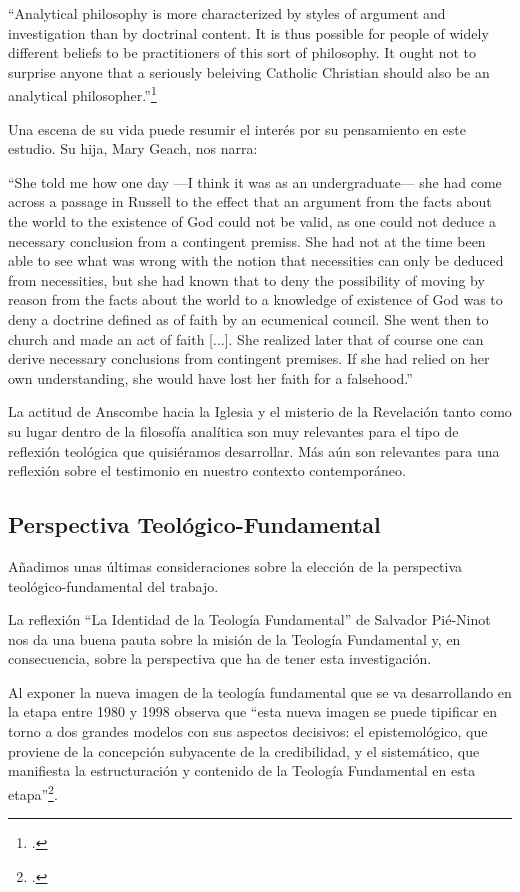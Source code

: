 \documentclass[12pt]{article}
\begin{document}
{``Analytical philosophy is more characterized by styles of argument and investigation than by doctrinal content. It is thus possible for people of widely different beliefs to be practitioners of this sort of philosophy. It ought not to surprise anyone that a seriously beleiving Catholic Christian should also be an analytical philosopher.''\footcite[66]{opinionsanscombe}

Una escena de su vida puede resumir el interés por su pensamiento en este estudio. Su hija, Mary Geach, nos narra:

``She told me how one day ---I think it was as an undergraduate--- she had come across a passage in Russell to the effect that an argument from the facts about the world to the existence of God could not be valid, as one could not deduce a necessary conclusion from a contingent premiss. She had not at the time been able to see what was wrong with the notion that necessities can only be deduced from necessities, but she had known that to deny the possibility of moving by reason from the facts about the world to a knowledge of existence of God was to deny a doctrine defined as of faith by an ecumenical council. She went then to church and made an act of faith [...]. She realized later that of course one can derive necessary conclusions from contingent premises. If she had relied on her own understanding, she would have lost her faith for a falsehood.''

La actitud de Anscombe hacia la Iglesia y el misterio de la Revelación tanto como su lugar dentro de la filosofía analítica son muy relevantes para el tipo de reflexión teológica que quisiéramos desarrollar. Más aún son relevantes para una reflexión sobre el testimonio en nuestro contexto contemporáneo.

\subsection{Perspectiva Teológico-Fundamental}

Añadimos unas últimas consideraciones sobre la elección de la perspectiva teológico-fundamental del trabajo. 

La reflexión ``La Identidad de la Teología Fundamental'' de Salvador Pié-Ninot nos da una buena pauta sobre la misión de la Teología Fundamental y, en consecuencia, sobre la perspectiva que ha de tener esta investigación. 

Al exponer la nueva imagen de la teología fundamental que se va desarrollando en la etapa entre 1980 y 1998 observa que ``esta nueva imagen se puede tipificar en torno a dos grandes modelos con sus aspectos decisivos: el epistemológico, que proviene de la concepción subyacente de la credibilidad, y el sistemático, que manifiesta la estructuración y contenido de la Teología Fundamental en esta etapa''\footcite[29]{ninotTF}.

}
\end{document}
